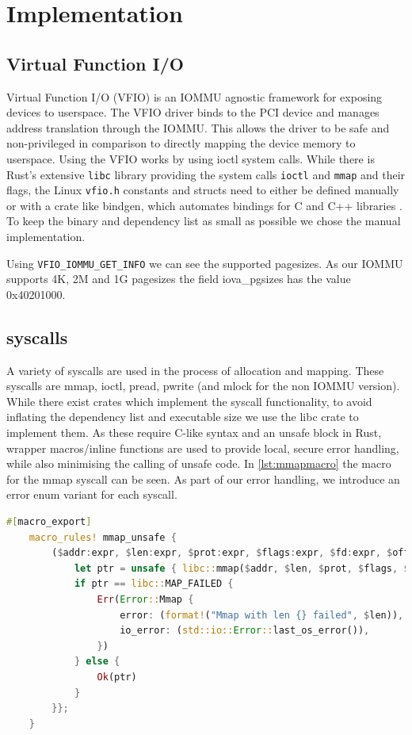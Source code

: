 \chapter{Implementation}

\section{Virtual Function I/O}
Virtual Function I/O (VFIO) is an IOMMU agnostic framework for exposing devices to userspace.
The VFIO driver binds to the PCI device and manages address translation through the IOMMU.
This allows the driver to be safe and non-privileged in comparison to directly mapping the device memory to userspace.
Using the VFIO works by using ioctl system calls.
While there is Rust's extensive \texttt{libc} library providing the system calls \texttt{ioctl} and \texttt{mmap} and their flags, the Linux \texttt{vfio.h} constants and structs need to either be defined manually or with a crate like bindgen, which automates bindings for C and C++ libraries \cite{cratebindgen}. To keep the binary and dependency list as small as possible we chose the manual implementation.

Using \texttt{VFIO\_IOMMU\_GET\_INFO} we can see the supported pagesizes. As our IOMMU supports 4K, 2M and 1G pagesizes the field iova\_pgsizes has the value 0x40201000.

\section{syscalls}
A variety of syscalls are used in the process of allocation and mapping. These syscalls are mmap, ioctl, pread, pwrite (and mlock for the non IOMMU version). While there exist crates which implement the syscall functionality, to avoid inflating the dependency list and executable size we use the libc crate to implement them. As these require C-like syntax and an unsafe block in Rust, wrapper macros/inline functions are used to provide local, secure error handling, while also minimising the calling of unsafe code. In \autoref{lst:mmapmacro} the macro for the mmap syscall can be seen.
As part of our error handling, we introduce an error enum variant for each syscall.

\begin{lstlisting}[language=Rust, label=lst:mmapmacro]
    #[macro_export]
    macro_rules! mmap_unsafe {
        ($addr:expr, $len:expr, $prot:expr, $flags:expr, $fd:expr, $offset:expr) => {{
            let ptr = unsafe { libc::mmap($addr, $len, $prot, $flags, $fd, $offset) };
            if ptr == libc::MAP_FAILED {
                Err(Error::Mmap {
                    error: (format!("Mmap with len {} failed", $len)),
                    io_error: (std::io::Error::last_os_error()),
                })
            } else {
                Ok(ptr)
            }
        }};
    } 
\end{lstlisting}

